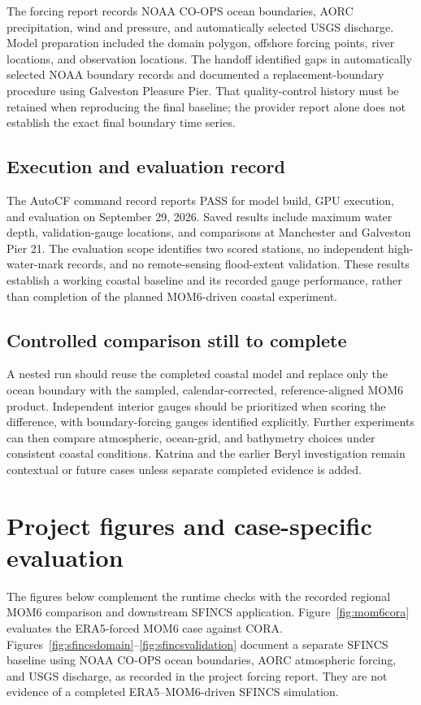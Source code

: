 \documentclass[11pt]{article}
\begin{document}
The forcing report records NOAA CO-OPS ocean boundaries, AORC precipitation, wind and pressure, and automatically selected USGS discharge. Model preparation included the domain polygon, offshore forcing points, river locations, and observation locations. The handoff identified gaps in automatically selected NOAA boundary records and documented a replacement-boundary procedure using Galveston Pleasure Pier. That quality-control history must be retained when reproducing the final baseline; the provider report alone does not establish the exact final boundary time series.

\subsection{Execution and evaluation record}

The AutoCF command record reports PASS for model build, GPU execution, and evaluation on September 29, 2026. Saved results include maximum water depth, validation-gauge locations, and comparisons at Manchester and Galveston Pier 21. The evaluation scope identifies two scored stations, no independent high-water-mark records, and no remote-sensing flood-extent validation. These results establish a working coastal baseline and its recorded gauge performance, rather than completion of the planned MOM6-driven coastal experiment.

\subsection{Controlled comparison still to complete}

A nested run should reuse the completed coastal model and replace only the ocean boundary with the sampled, calendar-corrected, reference-aligned MOM6 product. Independent interior gauges should be prioritized when scoring the difference, with boundary-forcing gauges identified explicitly. Further experiments can then compare atmospheric, ocean-grid, and bathymetry choices under consistent coastal conditions. Katrina and the earlier Beryl investigation remain contextual or future cases unless separate completed evidence is added.
\section{Project figures and case-specific evaluation}

The figures below complement the runtime checks with the recorded regional MOM6 comparison and downstream SFINCS application. Figure~\ref{fig:mom6cora} evaluates the ERA5-forced MOM6 case against CORA. Figures~\ref{fig:sfincsdomain}--\ref{fig:sfincsvalidation} document a separate SFINCS baseline using NOAA CO-OPS ocean boundaries, AORC atmospheric forcing, and USGS discharge, as recorded in the project forcing report. They are not evidence of a completed ERA5--MOM6-driven SFINCS simulation.
\end{document}
